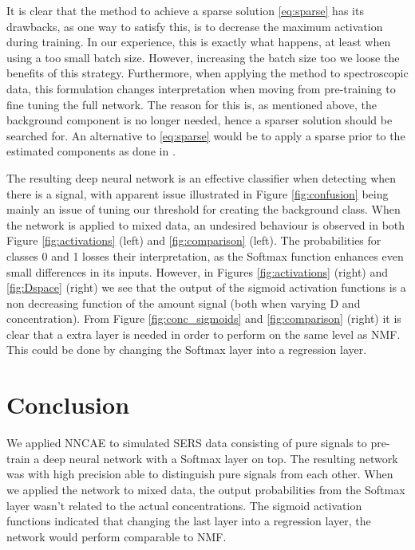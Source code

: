 \documentclass{article}
\begin{document}
It is clear that the method to achieve a sparse solution \eqref{eq:sparse} has its drawbacks, as one way to satisfy this, is to decrease the maximum activation during training. In our experience, this is exactly what happens, at least when using a too small batch size. However, increasing the batch size too we loose the benefits of this strategy. Furthermore, when applying the method to spectroscopic data, this formulation changes interpretation when moving from pre-training to fine tuning the full network. The reason for this is, as mentioned above, the background component is no longer needed, hence a sparser solution should be searched for. An alternative to \eqref{eq:sparse} would be to apply a sparse prior to the estimated components as done in \cite{snmf2006,ramanSNMF2014}.

The resulting deep neural network is an effective classifier when detecting when there is a signal, with apparent issue illustrated in Figure \ref{fig:confusion} being mainly an issue of tuning our threshold for creating the background class. When the network is applied to mixed data, an undesired behaviour is observed in both Figure \ref{fig:activations} (left) and \ref{fig:comparison} (left). The probabilities for classes 0 and 1 losses their interpretation, as the Softmax function enhances even small differences in its inputs. However, in Figures \ref{fig:activations} (right) and \ref{fig:Dspace} (right) we see that the output of the sigmoid activation functions is a non decreasing function of the amount signal (both when varying D and concentration). From Figure \ref{fig:conc_sigmoids} and \ref{fig:comparison} (right) it is clear that a extra layer is needed in order to perform on the same level as NMF. This could be done by changing the Softmax layer into a regression layer.



\section{Conclusion}
\label{sec:conclusion}
We applied NNCAE to simulated SERS data consisting of pure signals to pre-train a deep neural network with a Softmax layer on top. The resulting network was with high precision able to distinguish pure signals from each other. When we applied the network to mixed data, the output probabilities from the Softmax layer wasn't related to the actual concentrations. The sigmoid activation functions indicated that changing the last layer into a regression layer, the network would perform comparable to NMF.
\end{document}
